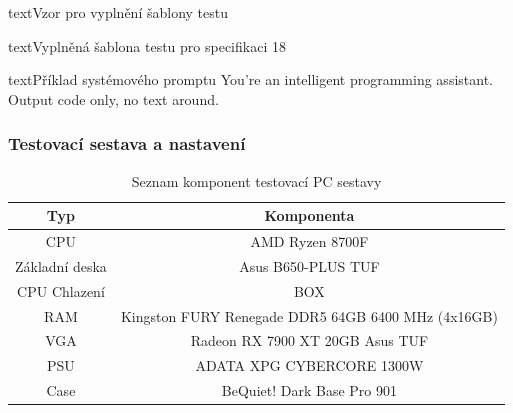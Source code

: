 \documentclass[czech, ma, kiv, he, iso690numb, pdf, viewonly]{fasthesis}
\begin{document}
\begin{code}{text}{Vzor pro vyplnění šablony testu \label{lst:template}}
{\begin{code}{text}{Vyplněná šablona testu pro specifikaci 18 \label{lst:spec18}}
{            \begin{code}{text}{Příklad systémového promptu \label{lst:system_prompt_example}}
You're an intelligent programming assistant. Output code only, no text around. \end{code}

            \subsubsection{Testovací sestava a nastavení}

            \begin{table}
                \begin{tabular}{|c|c|}
                    \hline
                    \textbf{Typ} & \textbf{Komponenta} \\
                    \hline
                    CPU & AMD Ryzen 8700F \\
                    \hline
                    Základní deska & Asus B650-PLUS TUF \\
                    \hline
                    CPU Chlazení & BOX \\
                    \hline
                    RAM & Kingston FURY Renegade DDR5 64GB 6400 MHz (4x16GB) \\
                    \hline
                    VGA & Radeon RX 7900 XT 20GB Asus TUF \\
                    \hline
                    PSU & ADATA XPG CYBERCORE 1300W \\
                    \hline
                    Case & BeQuiet! Dark Base Pro 901 \\
                    \hline
                \end{tabular}
                \centering
                \caption{Seznam komponent testovací PC sestavy}
                \label{tab:pc_components}
            \end{table}

}
\end{code}}
\end{code}
\end{document}
